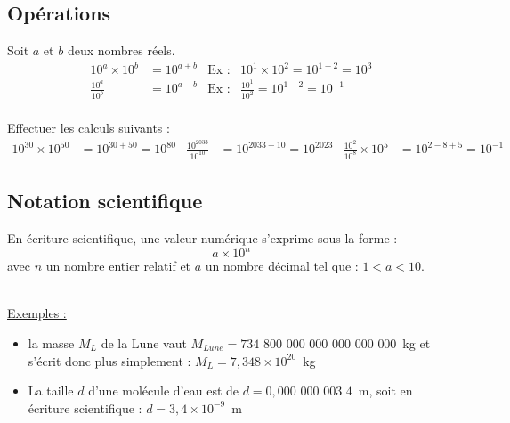 \subsection{Opérations}
\begin{tcolorbox}[colback=red!5!white,colframe=red!75!black,title=\textbf{Règles de calculs des puissances de 10}]
Soit $a$ et $b$ deux nombres réels.
\begin{align*}
    10^{a}\times 10^b &= 10^{a+b} & \text{Ex :}& 10^{1}\times 10^2 = 10^{1+2}=10^3 \\
    \frac{10^{a}}{10^b} &= 10^{a-b} & \text{Ex :}& \frac{10^{1}}{10^2} = 10^{1-2}=10^{-1} \\
\end{align*}

\end{tcolorbox}
\underline{Effectuer les calculs suivants :}
\begin{align*}
    10^{30} \times 10^{50} &= 10^{30+50}=10^{80} & \frac{10^{2033}}{10^{10}} &= 10^{2033-10} = 10^{2023} & \frac{10^2}{10^8}\times 10^5 &= 10^{2-8+5} = 10^{-1}
\end{align*}
\subsection{Notation scientifique}

\begin{tcolorbox}[colback=green!5!white,colframe=green!75!black,title=\textbf{Ecriture scientifique d'un nombre}]
En écriture scientifique, une valeur numérique s'exprime sous la forme :
\begin{equation*}
    a \times 10^n
\end{equation*}
avec $n$ un nombre entier relatif et $a$ un nombre décimal tel que : $1< a <10$.\\
\\
\end{tcolorbox}
\underline{Exemples :}
\begin{itemize}
    \item la masse $M_{L}$ de la Lune vaut $M_{Lune}=734$ $800$ $000$ $000$ $000$ $000$ $000$~kg et s'écrit donc plus simplement : $M_L=7,348\times 10^{20}$~kg
    \item La taille $d$ d'une molécule d'eau est de  $d=0,000$ $000$ $003$ $4$~m, soit en écriture scientifique : $d=3,4\times10^{-9}$~m
\end{itemize}

